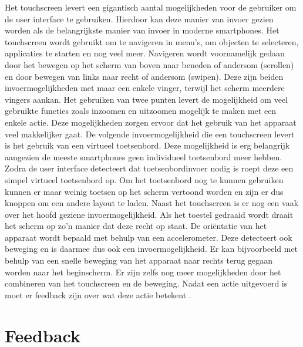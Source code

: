 Het touchscreen levert een gigantisch aantal mogelijkheden voor de gebruiker om de user interface te gebruiken.
Hierdoor kan deze manier van invoer gezien worden als de belangrijkste manier van invoer in moderne smartphones.
Het touchscreen wordt gebruikt om te navigeren in menu's, om objecten te selecteren, applicaties te starten en nog veel meer.
Navigeren wordt voornamelijk gedaan door het bewegen op het scherm van boven naar beneden of andersom (scrollen) en door bewegen van links naar recht of andersom (swipen).
Deze zijn beiden invoermogelijkheden met maar een enkele vinger, terwijl het scherm meerdere vingers aankan.
Het gebruiken van twee punten levert de mogelijkheid om veel gebruikte functies zoals inzoomen en uitzoomen mogelijk te maken met een enkele actie.
Deze mogelijkheden zorgen ervoor dat het gebruik  van het apparaat veel makkelijker gaat.
De volgende invoermogelijkheid die een touchscreen levert is het gebruik van een virtueel toetsenbord.
Deze mogelijkheid is erg belangrijk aangezien de meeste smartphones geen individueel toetsenbord meer hebben.
Zodra de user interface detecteert dat toetsenbordinvoer nodig is roept deze een simpel virtueel toetsenbord op.
Om het toetsenbord nog te kunnen gebruiken kunnen er maar weinig toetsen op het scherm vertoond worden en zijn er dus knoppen om een andere layout te laden.
 Naast het touchscreen is er nog een vaak over het hoofd geziene invoermogelijkheid.
Als het toestel gedraaid wordt draait het scherm op zo'n manier dat deze recht op staat.
De ori\"entatie van het apparaat wordt bepaald met behulp van een accelerometer.
Deze detecteert ook beweging en is daarmee dus ook een invoermogelijkheid.
Er kan bijvoorbeeld met behulp van een snelle beweging van het apparaat naar rechts terug gegaan worden naar het beginscherm.
Er zijn zelfs nog meer mogelijkheden door het combineren van het touchscreen en de beweging.
 Nadat een actie uitgevoerd is moet er feedback zijn over wat deze actie betekent \citep{designUI}.

\section{Feedback}

